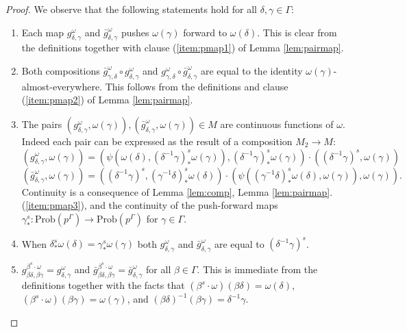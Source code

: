\documentclass[12pt]{amsart}
\theoremstyle{definition}
\newcommand{\Prob}{\mathrm{Prob}}
\begin{document}
\begin{proof}
	We observe that the following statements hold for all $\delta, \gamma \in \Gamma$:
	\begin{enumerate}
		\item \label{proofitem:fmap1} Each map $g_{\delta,\gamma}^\omega$ and $\bar g_{\delta, \gamma}^\omega$ pushes $\omega(\gamma)$ forward to $\omega(\delta)$. This is clear from the definitions together with clause (\ref{item:pmap1}) of Lemma \ref{lem:pairmap}.
		\item \label{proofitem:fmap2} \indent Both compositions $\bar g_{\gamma, \delta}^\omega \circ g_{\delta, \gamma}^\omega$ and $g_{\gamma, \delta}^\omega \circ \bar g_{\delta, \gamma}^\omega$ are equal to the identity $\omega(\gamma)$-almost-everywhere. This follows from the definitions and clause (\ref{item:pmap2}) of Lemma \ref{lem:pairmap}.
		\item \label{proofitem:fmap3} The pairs $(g_{\delta, \gamma}^\omega, \omega(\gamma)), (\bar g_{\delta, \gamma}^\omega, \omega(\gamma)) \in M$ are continuous functions of $\omega$. Indeed each pair can be expressed as the result of a composition $M_2 \rightarrow M$:
		\[(g_{\delta, \gamma}^\omega, \omega(\gamma)) = (\psi(\omega(\delta), (\delta^{-1} \gamma)^s_* \omega(\gamma)), (\delta^{-1} \gamma)^s_* \omega(\gamma)) \cdot ((\delta^{-1} \gamma)^s, \omega(\gamma))\]
		\[(\bar g_{\delta, \gamma}^\omega, \omega(\gamma)) = ((\delta^{-1} \gamma)^s, (\gamma^{-1} \delta)^s_* \omega(\delta)) \cdot (\psi((\gamma^{-1} \delta)^s_* \omega(\delta), \omega(\gamma)), \omega(\gamma)).\]
		Continuity is a consequence of Lemma \ref{lem:comp}, Lemma \ref{lem:pairmap}.(\ref{item:pmap3}), and the continuity of the push-forward maps $\gamma^s_* : \Prob(p^\Gamma) \rightarrow \Prob(p^\Gamma)$ for $\gamma \in \Gamma$.
		\item \label{proofitem:fmap4} When $\delta^s_* \omega(\delta) = \gamma^s_* \omega(\gamma)$ both $g_{\delta, \gamma}^\omega$ and $\bar g_{\delta, \gamma}^\omega$ are equal to $(\delta^{-1} \gamma)^s$.
		\item \label{proofitem:fmapa} $g_{\beta \delta, \beta \gamma}^{\beta^s \cdot \omega} = g_{\delta, \gamma}^\omega$ and $\bar g_{\beta \delta, \beta \gamma}^{\beta^s \cdot \omega} = \bar g_{\delta, \gamma}^\omega$ for all $\beta \in \Gamma$. This is immediate from the definitions together with the facts that $(\beta^s \cdot \omega)(\beta \delta) = \omega(\delta)$, $(\beta^s \cdot \omega)(\beta \gamma) = \omega(\gamma)$, and $(\beta \delta)^{-1} (\beta \gamma) = \delta^{-1} \gamma$.
	\end{enumerate}
	

\end{proof}
\end{document}
